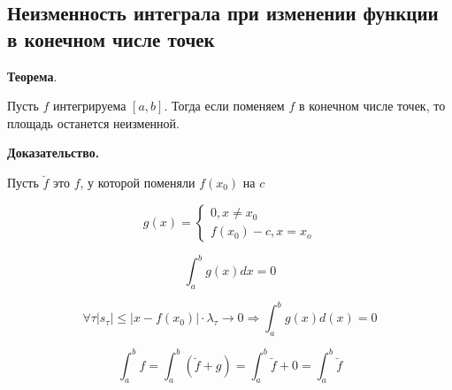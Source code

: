 \documentclass[a4paper]{article}
\begin{document}
\begin{definit}
\subsection*{Неизменность интеграла при изменении функции в конечном числе точек}
\begin{htheorem}\textbf{Теорема}.

Пусть $f$ интегрируема $[a,b]$. Тогда если поменяем $f$ в конечном числе точек, то площадь останется неизменной.
\end{htheorem}


\begin{hproof}\textbf{Доказательство.}

Пусть $\breve{f}$ это $f$, у которой поменяли $f(x_0)$ на $c$

\[
g(x) = \begin{cases} 0, x \neq x_0 \\ f(x_0) - c, x=x_o  \end{cases}
\]

\[
\int_a^b g(x)dx = 0
\]

\[
\forall \tau |s_\tau| \leq |x - f(x_0)| \cdot \lambda_\tau \rightarrow 0 \Rightarrow \int_a^b g(x)d(x) = 0
\]

\[
\int_a^b f = \int_a^b (\breve{f} + g) = \int_a^b \breve{f} + 0 =  \int_a^b \breve{f}
\]
\end{hproof}
\end{definit}
\end{document}
